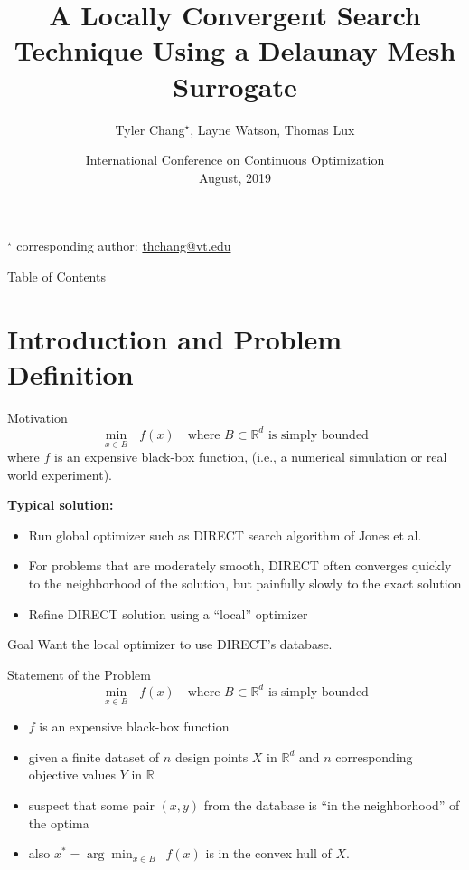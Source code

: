 \documentclass[xcolor=dvipsnames]{beamer}
\title{\bf A Locally Convergent Search Technique Using a Delaunay Mesh
Surrogate}
\date{International Conference on Continuous Optimization\\
August, 2019}
\author{Tyler Chang$^\star$, Layne Watson, Thomas Lux}
\institute{Virginia Polytechnic Institute and State University}
\begin{document}
\begin{frame}
\vfill
\titlepage
\vfill
{}$^\star$ corresponding author: \url{thchang@vt.edu}
\end{frame}

\begin{frame}{Table of Contents}
\tableofcontents
\end{frame}

\section{Introduction and Problem Definition}
\begin{frame}{Motivation}
$$
\min_{x \in B} \text{ } f(x) \quad\text{where }
B \subset \mathbb{R}^d\text{ is simply bounded}
$$
where $f$ is an expensive black-box function, (i.e., a numerical simulation
or real world experiment).\\ \pause

{\bf Typical solution:}\\ \pause
\begin{itemize}
\item Run global optimizer such as DIRECT search algorithm of Jones et al. \\ \pause
\item For problems that are moderately smooth, DIRECT often converges quickly
to the neighborhood of the solution, but painfully slowly to the
exact solution\\ \pause
\item Refine DIRECT solution using a ``local'' optimizer
\end{itemize}
\end{frame}

\begin{frame}{Goal}
Want the local optimizer to use DIRECT's database.
\end{frame}

\begin{frame}{Statement of the Problem}
$$
\min_{x \in B} \text{ } f(x) \quad\text{where }
B \subset \mathbb{R}^d\text{ is simply bounded}
$$
\begin{itemize}
\item $f$ is an expensive black-box function \\
\pause
\item given a finite dataset of $n$ design points $X$ in
$\mathbb{R}^d$ and $n$ corresponding objective values $Y$ in $\mathbb{R}$\\
\pause
\item suspect that some pair $(x,y)$ from the database is
``in the neighborhood'' of the optima\\
\pause
\item also $x^* = \arg\min_{x\in B}$~$f(x)$ is in the convex hull of $X$.
\end{itemize}
\end{frame}
\end{document}
